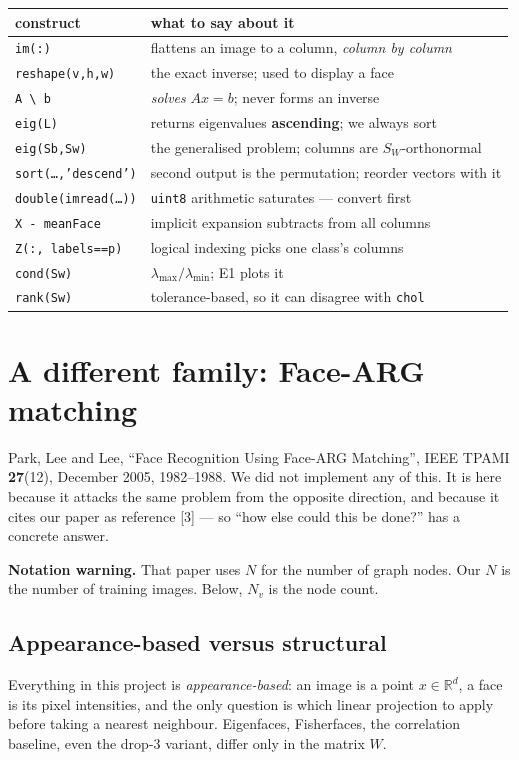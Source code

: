 \documentclass[11pt]{article}
\begin{document}
\begin{center}
\begin{tabular}{ll}\toprule
construct & what to say about it\\\midrule
\texttt{im(:)} & flattens an image to a column, \emph{column by column}\\
\texttt{reshape(v,h,w)} & the exact inverse; used to display a face\\
\verb|A \ b| & \emph{solves} $Ax=b$; never forms an inverse\\
\texttt{eig(L)} & returns eigenvalues \textbf{ascending}; we always sort\\
\texttt{eig(Sb,Sw)} & the generalised problem; columns are $S_W$-orthonormal\\
\texttt{sort(\dots,'descend')} & second output is the permutation; reorder vectors with it\\
\texttt{double(imread(\dots))} & \texttt{uint8} arithmetic saturates --- convert first\\
\texttt{X - meanFace} & implicit expansion subtracts from all columns\\
\texttt{Z(:, labels==p)} & logical indexing picks one class's columns\\
\texttt{cond(Sw)} & $\lambda_{\max}/\lambda_{\min}$; E1 plots it\\
\texttt{rank(Sw)} & tolerance-based, so it can disagree with \texttt{chol}\\\bottomrule
\end{tabular}
\end{center}

\section{A different family: Face-ARG matching}
Park, Lee and Lee, ``Face Recognition Using Face-ARG Matching'', IEEE TPAMI
\textbf{27}(12), December 2005, 1982--1988. We did not implement any of this.
It is here because it attacks the same problem from the opposite direction, and
because it cites our paper as reference [3] --- so ``how else could this be
done?'' has a concrete answer.

\textbf{Notation warning.} That paper uses $N$ for the number of graph nodes.
Our $N$ is the number of training images. Below, $N_v$ is the node count.

\subsection{Appearance-based versus structural}
Everything in this project is \emph{appearance-based}: an image is a point
$x\in\mathbb R^d$, a face is its pixel intensities, and the only question is
which linear projection to apply before taking a nearest neighbour. Eigenfaces,
Fisherfaces, the correlation baseline, even the drop-3 variant, differ only in
the matrix $W$.
\end{document}
